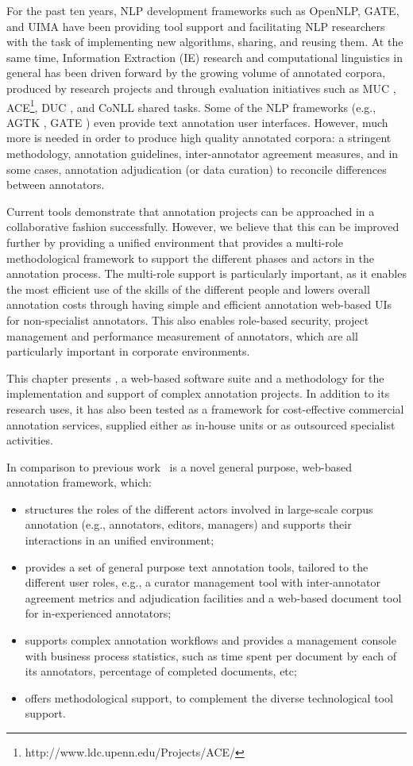 For the past ten years, NLP development frameworks such as OpenNLP, GATE, and UIMA have been providing tool support and facilitating NLP researchers with the task of implementing new algorithms, sharing, and reusing them.  At the same time, Information Extraction (IE) research and computational linguistics in general has been driven forward by the growing volume of annotated corpora, produced by research projects and through evaluation initiatives such as MUC \cite{Marsh98}, ACE\footnote{http://www.ldc.upenn.edu/Projects/ACE/}, DUC \cite{DUC2001}, and CoNLL shared tasks. Some of the NLP frameworks (e.g., AGTK \cite{Maeda04}, GATE \cite{Cun02b}) even provide text annotation user interfaces. However, much more is needed in order to produce high quality annotated corpora: a stringent methodology, annotation guidelines, inter-annotator agreement measures, and in some cases, annotation adjudication (or data curation) to reconcile differences between annotators. 

Current tools demonstrate that annotation projects can be approached in a collaborative fashion successfully. 
However, we believe that this can be improved further by providing a unified environment that provides a multi-role methodological framework to support the different phases and actors in the annotation process. The multi-role support is particularly important, as it enables the most efficient use of the skills of the different people and lowers overall annotation costs through having simple and efficient annotation web-based UIs for non-specialist annotators. This also enables role-based security, project management and performance measurement of annotators, which are all particularly important in corporate environments.

This chapter presents \teamware, a web-based software suite and a methodology for the implementation and support of complex annotation projects. In addition to its research uses, it has also been tested as a framework for cost-effective commercial annotation services, supplied either as in-house units or as outsourced specialist activities. 

In comparison to previous work \teamware\ is a novel general purpose, web-based annotation framework, which:
\begin{itemize}
  \item structures the roles of the different actors involved in large-scale corpus annotation (e.g., annotators, editors, managers) and supports their interactions in an unified environment;
  \item provides a set of general purpose text annotation tools, tailored to the different user roles, e.g., a curator management tool with inter-annotator agreement metrics and adjudication facilities and a web-based document tool for in-experienced annotators;
 \item supports complex annotation workflows and provides a management console with business process statistics, such as time spent per document by each of its annotators, percentage of completed documents, etc;
  \item offers methodological support, to complement the diverse technological tool support.
\end{itemize}

